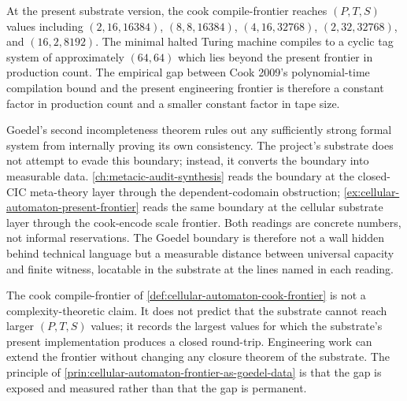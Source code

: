 \begin{example}
\label{ex:cellular-automaton-present-frontier}
At the present substrate version, the cook compile-frontier reaches \((P, T, S)\) values including \((2, 16, 16384)\), \((8, 8, 16384)\), \((4, 16, 32768)\), \((2, 32, 32768)\), and \((16, 2, 8192)\). The minimal halted Turing machine compiles to a cyclic tag system of approximately \((64, 64)\) which lies beyond the present frontier in production count. The empirical gap between Cook 2009's polynomial-time compilation bound and the present engineering frontier is therefore a constant factor in production count and a smaller constant factor in tape size.
\end{example}

\begin{principle}
\label{prin:cellular-automaton-frontier-as-goedel-data}
Goedel's second incompleteness theorem rules out any sufficiently strong formal system from internally proving its own consistency. The project's substrate does not attempt to evade this boundary; instead, it converts the boundary into measurable data. \autoref{ch:metacic-audit-synthesis} reads the boundary at the closed-CIC meta-theory layer through the dependent-codomain obstruction; \autoref{ex:cellular-automaton-present-frontier} reads the same boundary at the cellular substrate layer through the cook-encode scale frontier. Both readings are concrete numbers, not informal reservations. The Goedel boundary is therefore not a wall hidden behind technical language but a measurable distance between universal capacity and finite witness, locatable in the substrate at the lines named in each reading.
\end{principle}

\begin{remark}
\label{rem:cellular-automaton-not-complexity-frontier}
The cook compile-frontier of \autoref{def:cellular-automaton-cook-frontier} is not a complexity-theoretic claim. It does not predict that the substrate cannot reach larger \((P, T, S)\) values; it records the largest values for which the substrate's present implementation produces a closed round-trip. Engineering work can extend the frontier without changing any closure theorem of the substrate. The principle of \autoref{prin:cellular-automaton-frontier-as-goedel-data} is that the gap is exposed and measured rather than that the gap is permanent.
\end{remark}

